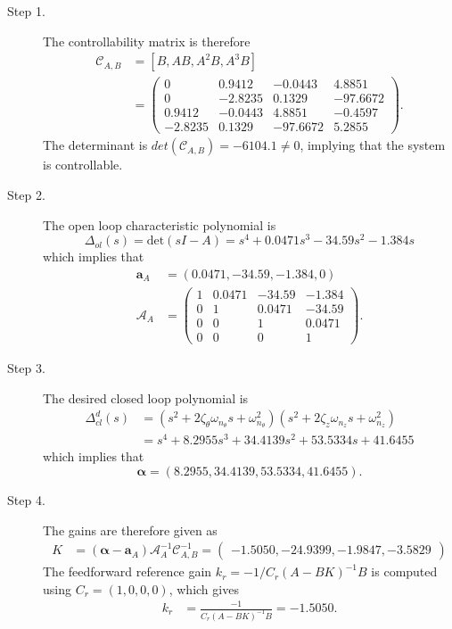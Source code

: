 \begin{description}
\item[Step 1.] 
The controllability matrix is therefore
\begin{align*}
\mathcal{C}_{A,B} &= [B, AB, A^2B, A^3B] \\
	&= \begin{pmatrix}           
	0 &   0.9412 &  -0.0443  &  4.8851 \\
    0  & -2.8235 &  0.1329 & -97.6672 \\
    0.9412  & -0.0443 &  4.8851 &  -0.4597 \\
   -2.8235  & 0.1329 & -97.6672 & 5.2855 \end{pmatrix}.
\end{align*}
The determinant is $det(\mathcal{C}_{A,B})=-6104.1 \neq 0$, implying that the system is controllable.  
\item[Step 2.] The open loop characteristic polynomial is
\[
\Delta_{ol}(s)=\text{det}(sI-A) = s^4 + 0.0471 s^3 - 34.59 s^2 - 1.384 s
\]
which implies that
\begin{align*}
\mathbf{a}_A &= (0.0471, -34.59, -1.384, 0) \\
\mathcal{A}_A &= \begin{pmatrix} 
1 & 0.0471 & -34.59 & -1.384 \\ 0 & 1 & 0.0471 & -34.59 \\ 0 & 0 & 1 & 0.0471 \\ 0 & 0 & 0 & 1
\end{pmatrix}.
\end{align*}

\item[Step 3.] The desired closed loop polynomial is
\begin{align*}
\Delta_{cl}^d(s) &= (s^2+2\zeta_{\theta}\omega_{n_\theta} s + \omega_{n_\theta}^2)(s^2+2\zeta_{z}\omega_{n_z} s + \omega_{n_z}^2) \\
&=s^4 + 8.2955 s^3 + 34.4139 s^2 + 53.5334 s + 41.6455       
\end{align*}
which implies that
\[
\boldsymbol{\alpha} = ( 8.2955, 34.4139, 53.5334, 41.6455).
\]

\item[Step 4.]
The gains are therefore given as
\begin{align*}
K &= (\boldsymbol{\alpha}-\mathbf{a}_A)\mathcal{A}_A^{-1}\mathcal{C}_{A,B}^{-1} 
= \begin{pmatrix} -1.5050,  -24.9399,   -1.9847,   -3.5829 \end{pmatrix}
\end{align*}
The feedforward reference gain $k_r=-1/C_r(A-BK)^{-1}B$ is computed using $C_r=(1,0,0,0)$, which gives
\begin{align*}
k_r &= \frac{-1}{C_r(A-BK)^{-1}B} 
  = -1.5050.
\end{align*}
\end{description}

